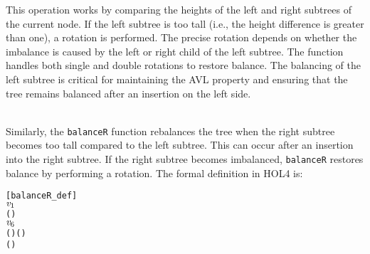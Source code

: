 \documentclass[12pt]{article}
\begin{document}
\begin{description}
  This operation works by comparing the heights of the left and right subtrees of the current node. If the left subtree is too tall (i.e., the height difference is greater than one), a rotation is performed. The precise rotation depends on whether the imbalance is caused by the left or right child of the left subtree. The function handles both single and double rotations to restore balance. The balancing of the left subtree is critical for maintaining the AVL property and ensuring that the tree remains balanced after an insertion on the left side.

  \item[\textbf{balanceR}] \\
  Similarly, the \texttt{balanceR} function rebalances the tree when the right subtree becomes too tall compared to the left subtree. This can occur after an insertion into the right subtree. If the right subtree becomes imbalanced, \texttt{balanceR} restores balance by performing a rotation. The formal definition in HOL4 is:

\begin{alltt}
[balanceR_def]
\HOLTokenTurnstile{}      \HOLSymConst{=}
      \HOLSymConst{=}   \HOLSymConst{\ensuremath{+}}  
       
        \HOLTokenImp{}     
     \HOLTokenBar{}  \ensuremath{\HOLBoundVar{v}\sb{\mathrm{1}}}     \HOLTokenImp{}
          \HOLSymConst{\HOLTokenGt{}}   
           
            \HOLTokenImp{}    (    ) 
         \HOLTokenBar{}  \ensuremath{\HOLBoundVar{v}\sb{\mathrm{6}}}     \HOLTokenImp{}
              (    ) (    )
           (    ) 
        
\end{alltt}


\end{description}
\end{document}
